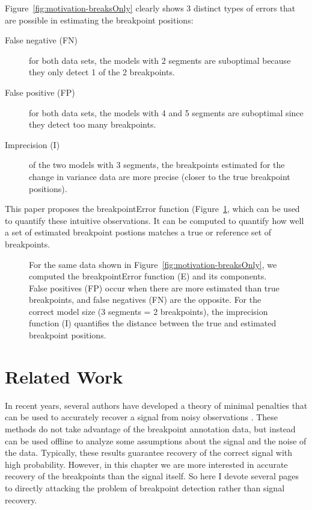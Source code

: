 \documentclass{jsfds} %
\begin{document}
\newpage

Figure~\ref{fig:motivation-breaksOnly} clearly shows 3 distinct types
of errors that are possible in estimating the breakpoint positions:
\begin{description}
\item[False negative (FN)] for both data sets, the models with 2
segments are suboptimal because they only detect 1 of the 2
breakpoints.
\item[False positive (FP)] for both data sets, the models with 4 and 5
  segments are suboptimal since they detect too many breakpoints.
\item[Imprecision (I)] of the two models with 3 segments, the
  breakpoints estimated for the change in variance data are more
  precise (closer to the true breakpoint positions).
\end{description}

This paper proposes the breakpointError function
(Figure~\ref{fig:motivation-breakpointError}, which can be used to
quantify these intuitive observations. It can be computed to quantify
how well a set of estimated breakpoint postions matches a true or
reference set of breakpoints.


\begin{figure}[H]
  \centering
  
  \vskip -0.7cm
  \caption{For the same data shown in
    Figure~\ref{fig:motivation-breaksOnly}, we computed the
    breakpointError function (E) and its components. False positives
    (FP) occur when there are more estimated than true breakpoints,
    and false negatives (FN) are the opposite. For the correct model
    size (3 segments = 2 breakpoints), the imprecision function (I)
    quantifies the distance between the true and estimated breakpoint
    positions.}
  \label{fig:motivation-breakpointError}
\end{figure}



\newpage

\section{Related Work}

In recent years, several authors have developed a theory of minimal
penalties that can be used to accurately recover a signal from noisy
observations \citep{calibration,lebarbier}. These methods do not take
advantage of the breakpoint annotation data, but instead can be used
offline to analyze some assumptions about the signal and the noise of
the data. Typically, these results guarantee recovery of the correct
signal with high probability. However, in this chapter we are more
interested in accurate recovery of the breakpoints than the signal
itself.
So here I devote several
pages to directly attacking the problem of breakpoint detection rather
than signal recovery.
\end{document}
